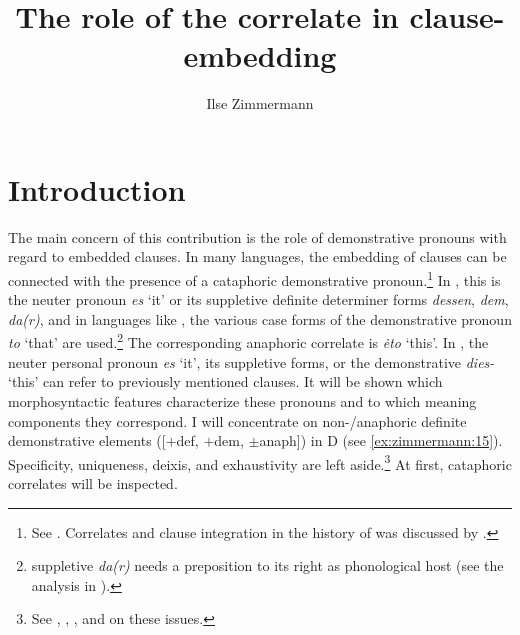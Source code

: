 \documentclass[output=paper]{langscibook}
\author{Ilse Zimmermann\affiliation{Leibniz-Zentrum Allgemeine Sprachwissenschaft Berlin}}
\title[The role of the correlate in clause-embedding]
      {The role of the correlate in clause-embedding}
\begin{document}
\abovedisplayskip=0pt
\maketitle

\section{Introduction}\label{s:1}

The main concern of this contribution is the role of demonstrative pronouns with regard to embedded clauses. In many languages, the embedding of clauses can be connected with the presence of a cataphoric demonstrative pronoun.\footnote{See \citet{Pütz1986,Sudhoff2003,Sudhoff2016,Mollica2010,Willer-Gold2013,SchwabeFreyMeinunger2016,Bondaruk2015,Knjazev2016,Zimmermann1967,Zimmermann1983,Zimmermann1993,Zimmermann2016b,Zimmermann2016a,Zimmermann2018a,Zimmermann2019c}. Correlates and clause integration in the history of  was discussed by \citet{Axel2009,Axel-Tober2011}.}
In , this is the neuter pronoun \textit{es} `it' or its suppletive definite determiner forms \textit{dessen}, \textit{dem}, \textit{da(r)}, and in  languages like , the various case forms of the demonstrative pronoun \textit{to} `that' are used.\footnote{ suppletive \textit{da(r)} needs a preposition to its right as phonological host (see the analysis in \citealt{Breindl1989}).} The corresponding anaphoric correlate is \textit{ėto} `this'. In , the neuter personal pronoun \textit{es} `it', its suppletive forms, or the demonstrative \textit{dies-} `this' can refer to previously mentioned clauses. It will be shown which morphosyntactic features characterize these pronouns and to which meaning components they correspond. I will concentrate on non-/anaphoric definite demonstrative elements ([$+$def, $+$dem, $\pm$anaph]) in D (see \ref{ex:zimmermann:15}). Specificity, uniqueness, deixis, and exhaustivity are left aside.\footnote{See  \citet{Schwarz2009}, \citet{Simik2016}, \citet{Bombi2018}, and \citet{Borik2019} on these issues.} At first, cataphoric correlates will be inspected.
\end{document}
